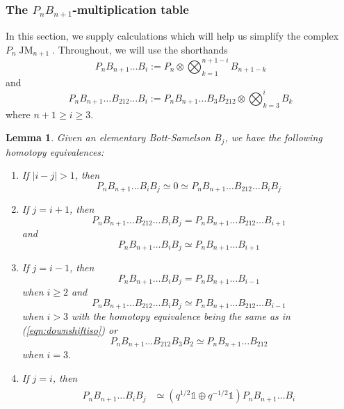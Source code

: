 \documentclass[11pt]{article}
\DeclareMathOperator{\JM}{JM}
\newtheorem{lemma}[thm]{Lemma}
\theoremstyle{definition}
\theoremstyle{remark}
\numberwithin{equation}{section}
\begin{document}
\subsubsection{The
$P_nB_{n+1}$-multiplication table}
\label{ssec:multtable}
In this section, we supply calculations which will help us simplify the complex
$P_n\JM_{n+1}$. Throughout, we will use the shorthands
\[P_{n}B_{n+1}\dots B_i:= P_n\otimes \bigotimes_{k=1}^{n+1-i}B_{n+1-k}\]
and
\[P_nB_{n+1}\dots B_{212}\dots B_{i}:= P_nB_{n+1}\dots B_3 B_{212}
\otimes \bigotimes_{k=3}^i B_k\]
where $n+1 \geq i \geq 3$.
\begin{lemma}
	\label{lem:basicmultiplications1}
Given an elementary Bott-Samelson $B_j$, we have the following
	homotopy equivalences:
	\begin{enumerate}[label=(\arabic*)]
		\item If $|i-j| >1$, then
			\begin{equation}
				\label{eqn:zerorelation1}
				P_nB_{n+1}\dots B_iB_j\simeq
				0\simeq P_nB_{n+1}\dots B_{212}\dots
				B_iB_j
			\end{equation}
		\item If $j=i+1$, then
			\begin{equation*}
			P_nB_{n+1}\dots B_{212}\dots B_iB_j=
			P_nB_{n+1}\dots B_{212}\dots B_{i+1}
			\end{equation*}
			and
			\begin{equation*}
			P_nB_{n+1}\dots B_iB_j\simeq
			P_nB_{n+1}\dots B_{i+1}
			\end{equation*}
			\item If $j=i-1$, then
		\begin{equation*}
		P_nB_{n+1}\dots B_iB_j= P_nB_{n+1}\dots B_{i-1}
		\end{equation*}
		when $i \geq 2$ and 
		\begin{equation*}
		P_nB_{n+1}\dots B_{212}\dots B_iB_j\simeq
		P_nB_{n+1}\dots B_{212}\dots B_{i-1}
		\end{equation*}
		when $i > 3$ with the homotopy equivalence being the same
		as in (\ref{eqn:downshiftiso}) or
		\begin{equation*}
		P_nB_{n+1}\dots B_{212}B_3B_2 \simeq P_nB_{n+1}\dots
		B_{212}
		\end{equation*}
		when $i=3$.
	\item If $j=i$, then
	\begin{align*}
		\begin{split}
		P_nB_{n+1}\dots B_iB_j &\simeq (q^{1/2}\mathbb{1}
		\oplus q^{-1/2}\mathbb{1})P_nB_{n+1}\dots B_i\\

\end{split}
\end{align*}
\end{enumerate}
\end{lemma}
\end{document}

